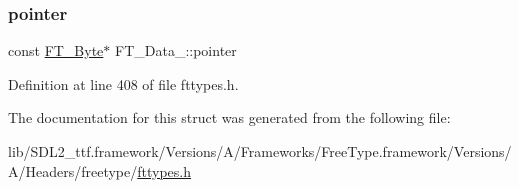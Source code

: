 \subsubsection{\texorpdfstring{pointer}{pointer}}
{\footnotesize\ttfamily const \mbox{\hyperlink{fttypes_8h_a51f26183ca0c9f4af958939648caeccd}{F\+T\+\_\+\+Byte}}$\ast$ F\+T\+\_\+\+Data\+\_\+\+::pointer}



Definition at line 408 of file fttypes.\+h.



The documentation for this struct was generated from the following file\+:\begin{DoxyCompactItemize}
\item 
lib/\+S\+D\+L2\+\_\+ttf.\+framework/\+Versions/\+A/\+Frameworks/\+Free\+Type.\+framework/\+Versions/\+A/\+Headers/freetype/\mbox{\hyperlink{fttypes_8h}{fttypes.\+h}}\end{DoxyCompactItemize}
